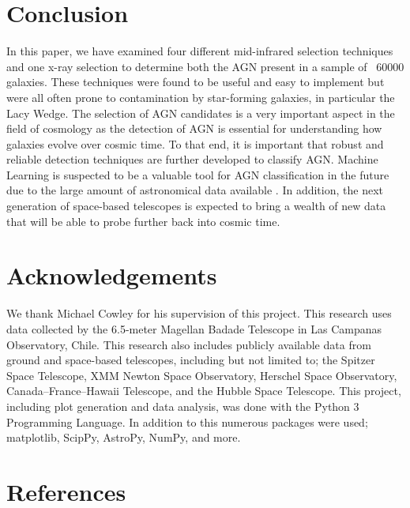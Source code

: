 \documentclass[11pt]{iopart}
\begin{document}
\section{Conclusion}
In this paper, we have examined four different mid-infrared selection techniques and one x-ray selection to determine both the AGN present in a sample of ~60000 galaxies. These techniques were found to be useful and easy to implement but were all often prone to contamination by star-forming galaxies, in particular the Lacy Wedge. The selection of AGN candidates is a very important aspect in the field of cosmology as the detection of AGN is essential for understanding how galaxies evolve over cosmic time. To that end, it is important that robust and reliable detection techniques are further developed to classify AGN. Machine Learning is suspected to be a valuable tool for AGN classification in the future due to the large amount of astronomical data available \cite{chang_identifying_2021}. In addition, the next generation of space-based telescopes is expected to bring a wealth of new data that will be able to probe further back into cosmic time.\cite{vikaeus_conditions_2022}
\newpage
\section*{Acknowledgements}
We thank Michael Cowley for his supervision of this project. This research uses data collected by the 6.5-meter Magellan Badade Telescope in Las Campanas Observatory, Chile. This research also includes publicly available data from ground and space-based telescopes, including but not limited to; the Spitzer Space Telescope, XMM Newton Space Observatory, Herschel Space Observatory, Canada–France–Hawaii Telescope, and the Hubble Space Telescope. This project, including plot generation and data analysis, was done with the Python 3 Programming Language. In addition to this numerous packages were used; matplotlib, ScipPy, AstroPy, NumPy, and more. 
\section*{References}



\end{document}
